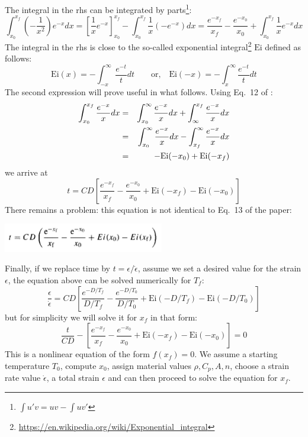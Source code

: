The integral in the rhs can be integrated by parts\footnote{$\int u'v = uv - \int uv'$}:
\[
\int_{x_0}^{x_f} \left(-\frac{1}{x^2} \right) e^{-x} dx 
=  \left[\frac{1}{x} e^{-x} \right]_{x_0}^{x_f} - \int_{x_0}^{x_f} \frac{1}{x} (-e^{-x}) dx
= \frac{e^{-x_f}}{x_f}  - \frac{e^{-x_0}}{x_0}  +
\int_{x_0}^{x_f} \frac{1}{x} e^{-x} dx
\]
The integral in the rhs is close to the so-called 
exponential integral\footnote{\url{https://en.wikipedia.org/wiki/Exponential_integral}}
$\text{Ei}$ defined as follows:
\[
\text{Ei}(x)= - \int_{-x}^\infty \frac{e^{-t}}{t} dt 
\qquad \text{or,} \quad
\text{Ei}(-x)= -\int_{x}^\infty \frac{e^{-t}}{t} dt
\]
The second expression will prove useful in what follows.
Using Eq.~12 of \textcite{stuw98}: 
\begin{eqnarray}
\int_{x_0}^{x_f} \frac{ e^{-x}}{x}  dx
&=& \int_{x_0}^\infty \frac{e^{-x}   }{x}  dx + \int^{x_f}_\infty \frac{e^{-x}}{x}  dx \nonumber\\
&=& \int_{x_0}^\infty \frac{e^{-x}   }{x}  dx - \int_{x_f}^\infty \frac{e^{-x}}{x}  dx \nonumber\\
&=& -\text{Ei}(-x_0) + \text{Ei}(-x_f)
\end{eqnarray}
we arrive at 
\[
\boxed{
t= CD \left[
\frac{e^{-x_f}}{x_f}  - \frac{e^{-x_0}}{x_0}  
+ \text{Ei}(-x_f) -\text{Ei}(-x_0) 
\right]
}
\]
There remains a problem: this equation is not identical to Eq.~13 
of the paper:
\begin{center}
\includegraphics[width=7cm]{python_codes/fieldstone_167/images/stuw98_eq}
\end{center}


Finally, if we replace time by $t=\epsilon / \dot\epsilon$, assume we set a 
desired value for the strain $\epsilon$, the equation above can be solved numerically for $T_f$:
\[
\frac{\epsilon}{\dot\epsilon} = 
CD
\left[
\frac{e^{-D/T_f}}{D/T_f}  - \frac{e^{-D/T_0}}{D/T_0}  
+ \text{Ei}(-D/T_f) -\text{Ei}(-D/T_0) 
\right]
\]
but for simplicity we will solve it for $x_f$ in that form:
\begin{equation}
\frac{t}{CD}
-
\left[
\frac{e^{-x_f}}{x_f}  - \frac{e^{-x_0}}{x_0}  
+ \text{Ei}(-x_f) -\text{Ei}(-x_0) 
\right]
=0
\label{f167:eqnl}
\end{equation}
This is a nonlinear equation of the form $f(x_f)=0$. We assume a starting temperature $T_0$, 
compute $x_0$, assign material values $\rho,C_p,A,n$, choose a strain rate value $\dot\epsilon$, 
a total strain $\epsilon$ and can then proceed to solve the equation for $x_f$.




